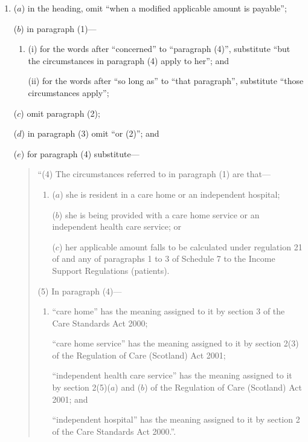 \documentclass[12pt,a4paper]{article}
\begin{document}
\begin{enumerate}\item[]
($a$) in the heading, omit “when a modified applicable amount is payable”;

($b$) in paragraph (1)—
\begin{enumerate}\item[]
(i) for the words after “concerned” to “paragraph (4)”, substitute “but the circumstances in paragraph (4) apply to her”; and

(ii) for the words after “so long as” to “that paragraph”, substitute “those circumstances apply”;
\end{enumerate}

($c$) omit paragraph (2);

($d$) in paragraph (3) omit “or (2)”; and

($e$) for paragraph (4) substitute—
\begin{quotation}
“(4) The circumstances referred to in paragraph (1) are that—
\begin{enumerate}\item[]
($a$) she is resident in a care home or an independent hospital;

($b$) she is being provided with a care home service or an independent health care service; or

($c$) her applicable amount falls to be calculated under regulation 21 of and any of paragraphs 1 to 3 of Schedule 7 to the Income Support Regulations (patients).
\end{enumerate}

(5) In paragraph (4)—
\begin{enumerate}\item[]
“care home” has the meaning assigned to it by section 3 of the Care Standards Act 2000;

“care home service” has the meaning assigned to it by section 2(3) of the Regulation of Care (Scotland) Act 2001;

“independent health care service” has the meaning assigned to it by section 2(5)($a$)  and ($b$)  of the Regulation of Care (Scotland) Act 2001; and

“independent hospital” has the meaning assigned to it by section 2 of the Care Standards Act 2000.”.
\end{enumerate}
\end{quotation}
\end{enumerate}
\end{document}
